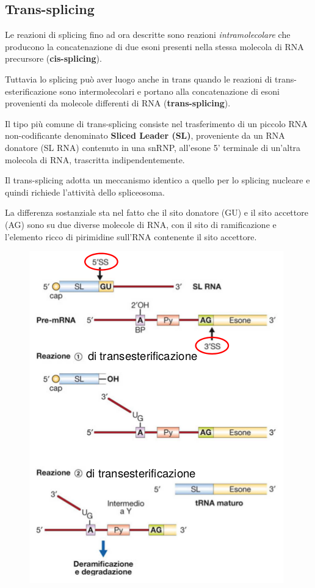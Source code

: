 \documentclass[11pt]{book}
\begin{document}
\subsection{Trans-splicing}\label{trans-splicing}

Le reazioni di splicing fino ad ora descritte sono reazioni
\emph{intramolecolare} che producono la concatenazione di due esoni
presenti nella stessa molecola di RNA precursore
(\textbf{cis-splicing}).

Tuttavia lo splicing può aver luogo anche in trans quando le reazioni di
trans-esterificazione sono intermolecolari e portano alla concatenazione
di esoni provenienti da molecole differenti di RNA
(\textbf{trans-splicing}).

Il tipo più comune di trans-splicing consiste nel trasferimento di un
piccolo RNA non-codificante denominato \textbf{Sliced Leader (SL)},
proveniente da un RNA donatore (SL RNA) contenuto in una snRNP,
all'esone 5' terminale di un'altra molecola di RNA, trascritta
indipendentemente.

Il trans-splicing adotta un meccanismo identico a quello per lo splicing
nucleare e quindi richiede l'attività dello spliceosoma.

La differenza sostanziale sta nel fatto che il sito donatore (GU) e il
sito accettore (AG) sono su due diverse molecole di RNA, con il sito di
ramificazione e l'elemento ricco di pirimidine sull'RNA contenente il
sito accettore.

\begin{figure}[htp]
\centering
\includegraphics[scale=1.00]{img/48_Trans-splicing.png}
\caption{}
\label{trans-splicing}
\end{figure}
\end{document}
